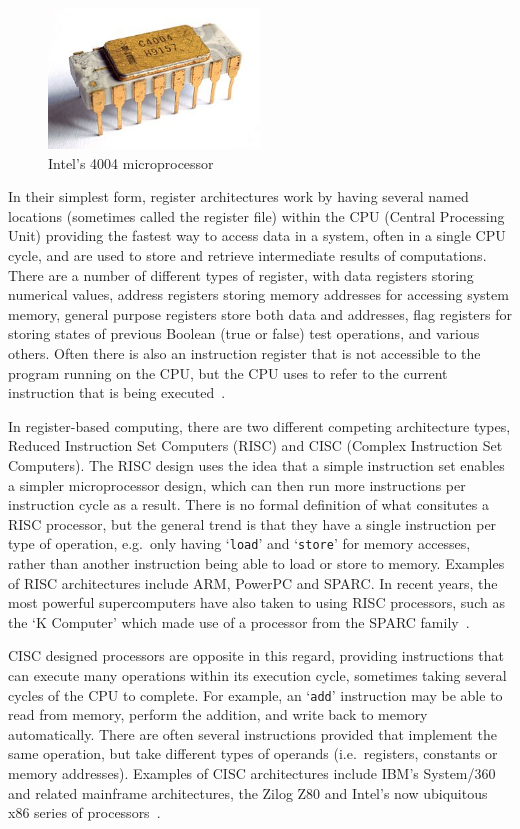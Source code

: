 \begin{figure}
  \includegraphics[width=0.5\textwidth]{imgs/Intel_C4004}
  \caption{Intel's 4004 microprocessor}\label{fig:4004}
\end{figure}

In their simplest form, register architectures work by having several named
locations (sometimes called the register file) within the CPU (Central
Processing Unit) providing the fastest way to access data in a system, often in
a single CPU cycle, and are used to store and retrieve intermediate results of
computations. There are a number of different types of register, with data
registers storing numerical values, address registers storing memory addresses
for accessing system memory, general purpose registers store both data and
addresses, flag registers for storing states of previous Boolean (true or false)
test operations, and various others. Often there is also an instruction
register that is not accessible to the program running on the CPU, but the CPU
uses to refer to the current instruction that is being
executed~\cite{Mittal2016RegisterFile}\cite{Patterson2011Computer}.

In register-based computing, there are two different competing architecture
types, Reduced Instruction Set Computers (RISC) and CISC (Complex Instruction
Set Computers). The RISC design uses the idea that a simple instruction set
enables a simpler microprocessor design, which can then run more instructions
per instruction cycle as a result. There is no formal definition of what
consitutes a RISC processor, but the general trend is that they have a single
instruction per type of operation, e.g.\ only having `\texttt{load}' and
`\texttt{store}' for memory accesses, rather than another instruction being able
to load or store to memory. Examples of RISC architectures include ARM, PowerPC
and SPARC\@. In recent years, the most powerful supercomputers have also taken
to using RISC processors, such as the `K Computer' which made use of a
processor from the SPARC family~\cite{Yokokawa2011KCJ}.

CISC designed processors are opposite in this regard, providing instructions
that can execute many operations within its execution cycle, sometimes taking
several cycles of the CPU to complete. For example, an `\texttt{add}'
instruction may be able to read from memory, perform the addition, and write
back to memory automatically. There are often several instructions provided that
implement the same operation, but take different types of operands (i.e.\
registers, constants or memory addresses). Examples of CISC architectures
include IBM's System/360 and related mainframe architectures, the Zilog Z80 and
Intel's now ubiquitous x86 series of processors~\cite{Patterson1980CRI}.

